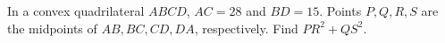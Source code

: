 In a convex quadrilateral $ABCD$, $AC=28$ and $BD=15$. Points $P,Q,R,S$ are the midpoints of $AB,BC,CD,DA$, respectively. Find $PR^2+QS^2$.
